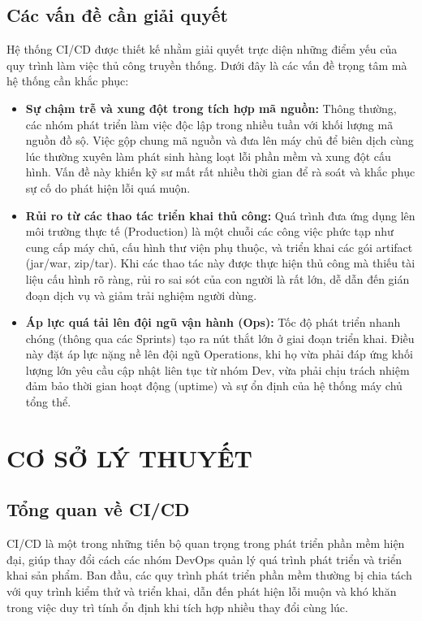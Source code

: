 \documentclass[12pt,a4paper,oneside]{extreport}
\begin{document}
\section{Các vấn đề cần giải quyết}
Hệ thống CI/CD được thiết kế nhằm giải quyết trực diện những điểm yếu của quy
trình làm việc thủ công truyền thống. Dưới đây là các vấn đề trọng tâm mà hệ
thống cần khắc phục:
\begin{itemize}
  \item \textbf{Sự chậm trễ và xung đột trong tích hợp mã nguồn:} Thông thường,
  các nhóm phát triển làm việc độc lập trong nhiều tuần với khối lượng mã nguồn
  đồ sộ. Việc gộp chung mã nguồn và đưa lên máy chủ để biên dịch cùng lúc
  thường xuyên làm phát sinh hàng loạt lỗi phần mềm và xung đột cấu hình. Vấn
  đề này khiến kỹ sư mất rất nhiều thời gian để rà soát và khắc phục sự cố do
  phát hiện lỗi quá muộn.
  \item \textbf{Rủi ro từ các thao tác triển khai thủ công:} Quá trình đưa ứng
  dụng lên môi trường thực tế (Production) là một chuỗi các công việc phức tạp
  như cung cấp máy chủ, cấu hình thư viện phụ thuộc, và triển khai các gói
  artifact (jar/war, zip/tar). Khi các thao tác này được thực hiện thủ công mà
  thiếu tài liệu cấu hình rõ ràng, rủi ro sai sót của con người là rất lớn, dễ
  dẫn đến gián đoạn dịch vụ và giảm trải nghiệm người dùng.
  \item \textbf{Áp lực quá tải lên đội ngũ vận hành (Ops):} Tốc độ phát triển
  nhanh chóng (thông qua các Sprints) tạo ra nút thắt lớn ở giai đoạn triển
  khai. Điều này đặt áp lực nặng nề lên đội ngũ Operations, khi họ vừa phải đáp
  ứng khối lượng lớn yêu cầu cập nhật liên tục từ nhóm Dev, vừa phải chịu trách
  nhiệm đảm bảo thời gian hoạt động (uptime) và sự ổn định của hệ thống máy chủ
  tổng thể.
\end{itemize}

\chapter{CƠ SỞ LÝ THUYẾT}
\label{chap:theory}
\section{Tổng quan về CI/CD}
CI/CD là một trong những tiến bộ quan trọng trong phát triển phần mềm hiện đại,
giúp thay đổi cách các nhóm DevOps quản lý quá trình phát triển và triển khai
sản phẩm. Ban đầu, các quy trình phát triển phần mềm thường bị chia tách với
quy trình kiểm thử và triển khai, dẫn đến phát hiện lỗi muộn và khó khăn trong
việc duy trì tính ổn định khi tích hợp nhiều thay đổi cùng lúc.
\end{document}
